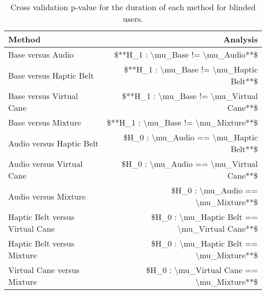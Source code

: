 
\begin{table}[!htb]
\centering
\caption{Cross validation p-value for the duration of each method for blinded users.}
\label{tab:lsd_duration_var}
\begin{tabular}{lr}
\toprule
                         Method &                                      Analysis \\
\midrule
              Base versus Audio &             \$**H\_1 : \textbackslash mu\_Base != \textbackslash mu\_Audio**\$ \\
        Base versus Haptic Belt &       \$**H\_1 : \textbackslash mu\_Base != \textbackslash mu\_Haptic Belt**\$ \\
       Base versus Virtual Cane &      \$**H\_1 : \textbackslash mu\_Base != \textbackslash mu\_Virtual Cane**\$ \\
            Base versus Mixture &           \$**H\_1 : \textbackslash mu\_Base != \textbackslash mu\_Mixture**\$ \\
       Audio versus Haptic Belt &        \$H\_0 : \textbackslash mu\_Audio == \textbackslash mu\_Haptic Belt**\$ \\
      Audio versus Virtual Cane &       \$H\_0 : \textbackslash mu\_Audio == \textbackslash mu\_Virtual Cane**\$ \\
           Audio versus Mixture &            \$H\_0 : \textbackslash mu\_Audio == \textbackslash mu\_Mixture**\$ \\
Haptic Belt versus Virtual Cane & \$H\_0 : \textbackslash mu\_Haptic Belt == \textbackslash mu\_Virtual Cane**\$ \\
     Haptic Belt versus Mixture &      \$H\_0 : \textbackslash mu\_Haptic Belt == \textbackslash mu\_Mixture**\$ \\
    Virtual Cane versus Mixture &     \$H\_0 : \textbackslash mu\_Virtual Cane == \textbackslash mu\_Mixture**\$ \\
\bottomrule
\end{tabular}
\end{table}

